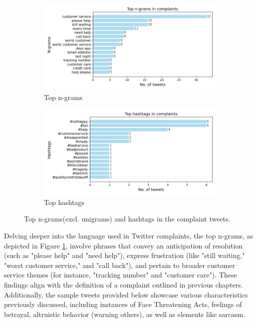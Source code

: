 \begin{figure}[htbp]
    \centering
    \captionsetup{font=small}
    \begin{subfigure}{0.49\textwidth}
        \centering
        \includegraphics[width=\linewidth]{figures/top_ngram_horiz_bar.png}
        \caption{Top n-grams}
        \label{fig: top_ngrams}
    \end{subfigure}
    \hfill
    \begin{subfigure}{0.49\textwidth}
        \centering
        \includegraphics[width=\linewidth]{figures/top_hash_horiz_bar.png}
        \caption{Top hashtags}
        \label{fig: top_hashtags}
    \end{subfigure}
    \caption{Top n-grams(excl. unigrams) and hashtags in the complaint tweets.}
    \label{fig: top_ngrams_hashtags}
\end{figure}

Delving deeper into the language used in Twitter complaints, the top n-grams, as depicted in Figure \ref{fig: top_ngrams}, involve phrases that convey an anticipation of resolution (such as "please help" and "need help"), express frustration (like "still waiting," "worst customer service," and "call back"), and pertain to broader customer service themes (for instance, "tracking number" and "customer care"). These findings align with the definition of a complaint outlined in previous chapters. Additionally, the sample tweets provided below showcase various characteristics previously discussed, including instances of Face Threatening Acts, feelings of betrayal, altruistic behavior (warning others), as well as elements like sarcasm.\\

